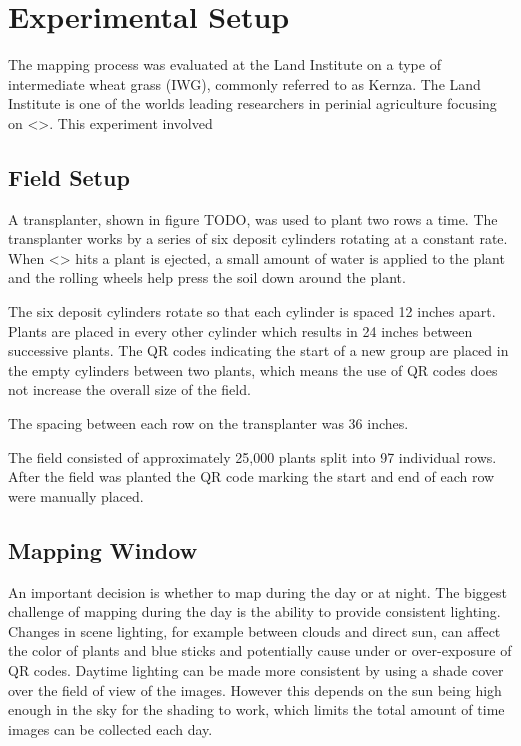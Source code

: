 
\cleardoublepage

\chapter{Experimental Setup}
\label{experiment}

The mapping process was evaluated at the Land Institute on a type of intermediate wheat grass (IWG), commonly referred to as Kernza.  The Land Institute is one of the worlds leading researchers in perinial agriculture focusing on <>. This experiment involved


\section{Field Setup}
\label{experiment-field}

A transplanter, shown in figure TODO, was used to plant two rows a time.  The transplanter works by a series of six deposit cylinders rotating at a constant rate.  When <> hits a plant is ejected, a small amount of water is applied to the plant and the rolling wheels help press the soil down around the plant.  

The six deposit cylinders rotate so that each cylinder is spaced 12 inches apart.  Plants are placed in every other cylinder which results in 24 inches between successive plants.  The QR codes indicating the start of a new group are placed in the empty cylinders between two plants, which means the use of QR codes does not increase the overall size of the field. 
 
The spacing between each row on the transplanter was 36 inches. 

The field consisted of approximately 25,000 plants split into 97 individual rows.  After the field was planted the QR code marking the start and end of each row were manually placed.



\section{Mapping Window}

An important decision is whether to map during the day or at night.  The biggest challenge of mapping during the day is the ability to provide consistent lighting.  Changes in scene lighting, for example between clouds and direct sun, can affect the color of plants and blue sticks and potentially cause under or over-exposure of QR codes.  Daytime lighting can be made more consistent by using a shade cover over the field of view of the images.  However this depends on the sun being high enough in the sky for the shading to work, which limits the total amount of time images can be collected each day.  

